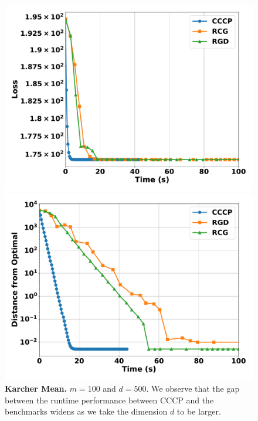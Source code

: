 \documentclass[sn-nature]{sn-jnl}%
\theoremstyle{thmstyleone}%
\theoremstyle{thmstyletwo}%
\theoremstyle{thmstylethree}%
\begin{document}
\begin{figure}[htbp]
  \centering
  \begin{minipage}[b]{0.45\textwidth}
    \centering
    \includegraphics[width=\textwidth]{figuresV2/karcher_mean/loss_time_100_500_medium.pdf}
  \end{minipage}
  \hfill
  \begin{minipage}[b]{0.45\textwidth}
    \centering
    \includegraphics[width=\textwidth]{figuresV2/karcher_mean/distance_time_100_500_medium.pdf}
  \end{minipage}
  \caption{\textbf{Karcher Mean.} $m=100$ and $d=500$. We observe that the gap between the runtime performance between CCCP and the benchmarks widens as we take the dimension $d$ to be larger.}
  \label{fig:karche_mean_100_500}
\end{figure}
\end{document}
